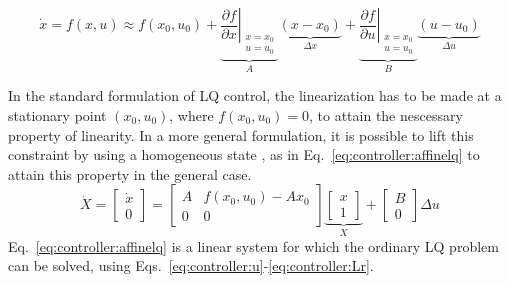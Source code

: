     \begin{equation}
        \label{eq:controller:gainscheduling:xdot}
        \dot{x} = f(x,u) \approx f(x_{0},u_{0})
            + \underbrace{\left. \frac{\partial f}{\partial x} \right|_{
                \begin{array}{l}
                    x=x_{0} \\
                    u=u_{0}
                \end{array}
            }}_{A}
                \underbrace{\left( x-x_{0} \right)}_{\Delta x}
            + \underbrace{\left. \frac{\partial f}{\partial u} \right|_{
                \begin{array}{l}
                    x=x_{0} \\
                    u=u_{0}
                \end{array}
            }}_{B}
                \underbrace{\left( u-u_{0} \right)}_{\Delta u}
    \end{equation}

    In the standard formulation of LQ control, the linearization has to be made
    at a stationary point $(x_{0},u_{0})$, where $f(x_{0},u_{0}) = 0$, to
    attain the nescessary property of linearity.
    In a more general formulation, it is possible to lift this constraint by
    using a homogeneous state \citep{Rantzer99piecewiselinear}, as in Eq.~\eqref{eq:controller:affinelq}
    to attain this property in the general case.
    \begin{equation}
    \label{eq:controller:affinelq}
        \dot{X} = \left[
        \begin{array}{c}
            \dot{x} \\
            0
        \end{array}\right] =
        \left[
        \begin{array}{cc}
            A & f(x_{0},u_{0})-Ax_{0} \\
            0 & 0
        \end{array}\right]
        \underbrace{\left[
        \begin{array}{c}
            x \\
            1
        \end{array}\right]}_{X}
        +
        \left[
        \begin{array}{c}
            B \\
            0
        \end{array}\right]
        \Delta u
    \end{equation}
    Eq.~\eqref{eq:controller:affinelq} is a linear system for which
    the ordinary LQ problem can be solved, using Eqs.~\eqref{eq:controller:u}-\eqref{eq:controller:Lr}.

